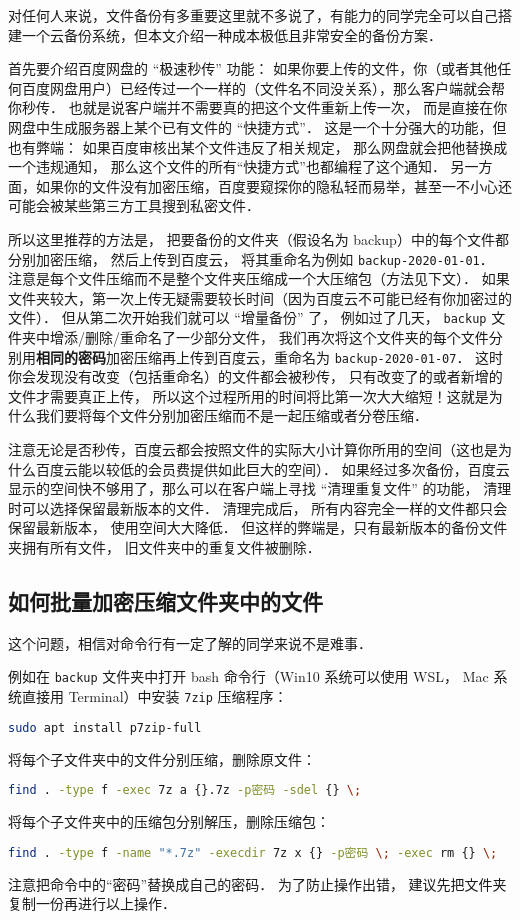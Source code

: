 
对任何人来说，文件备份有多重要这里就不多说了，有能力的同学完全可以自己搭建一个云备份系统，但本文介绍一种成本极低且非常安全的备份方案．

首先要介绍百度网盘的 “极速秒传” 功能： 如果你要上传的文件，你（或者其他任何百度网盘用户）已经传过一个一样的（文件名不同没关系），那么客户端就会帮你秒传． 也就是说客户端并不需要真的把这个文件重新上传一次， 而是直接在你网盘中生成服务器上某个已有文件的 “快捷方式”． 这是一个十分强大的功能，但也有弊端： 如果百度审核出某个文件违反了相关规定， 那么网盘就会把他替换成一个违规通知， 那么这个文件的所有“快捷方式”也都编程了这个通知． 另一方面，如果你的文件没有加密压缩，百度要窥探你的隐私轻而易举，甚至一不小心还可能会被某些第三方工具搜到私密文件．

所以这里推荐的方法是， 把要备份的文件夹（假设名为 backup）中的每个文件都分别加密压缩， 然后上传到百度云， 将其重命名为例如 \verb|backup-2020-01-01|． 注意是每个文件压缩而不是整个文件夹压缩成一个大压缩包（方法见下文）． 如果文件夹较大，第一次上传无疑需要较长时间（因为百度云不可能已经有你加密过的文件）． 但从第二次开始我们就可以 “增量备份” 了， 例如过了几天， \verb|backup| 文件夹中增添/删除/重命名了一少部分文件， 我们再次将这个文件夹的每个文件分别用\textbf{相同的密码}加密压缩再上传到百度云，重命名为 \verb|backup-2020-01-07|． 这时你会发现没有改变（包括重命名）的文件都会被秒传， 只有改变了的或者新增的文件才需要真正上传， 所以这个过程所用的时间将比第一次大大缩短！这就是为什么我们要将每个文件分别加密压缩而不是一起压缩或者分卷压缩．

注意无论是否秒传，百度云都会按照文件的实际大小计算你所用的空间（这也是为什么百度云能以较低的会员费提供如此巨大的空间）． 如果经过多次备份，百度云显示的空间快不够用了，那么可以在客户端上寻找 “清理重复文件” 的功能， 清理时可以选择保留最新版本的文件． 清理完成后， 所有内容完全一样的文件都只会保留最新版本， 使用空间大大降低． 但这样的弊端是，只有最新版本的备份文件夹拥有所有文件， 旧文件夹中的重复文件被删除．

\subsection{如何批量加密压缩文件夹中的文件}

这个问题，相信对命令行有一定了解的同学来说不是难事．

例如在 \verb|backup| 文件夹中打开 bash 命令行（Win10 系统可以使用 WSL， Mac 系统直接用 Terminal）中安装 \verb|7zip| 压缩程序：
\begin{lstlisting}[language=bash]
sudo apt install p7zip-full
\end{lstlisting}
将每个子文件夹中的文件分别压缩，删除原文件：
\begin{lstlisting}[language=bash]
find . -type f -exec 7z a {}.7z -p密码 -sdel {} \;
\end{lstlisting}
将每个子文件夹中的压缩包分别解压，删除压缩包：
\begin{lstlisting}[language=bash]
find . -type f -name "*.7z" -execdir 7z x {} -p密码 \; -exec rm {} \;
\end{lstlisting}
注意把命令中的“密码”替换成自己的密码． 为了防止操作出错， 建议先把文件夹复制一份再进行以上操作．
